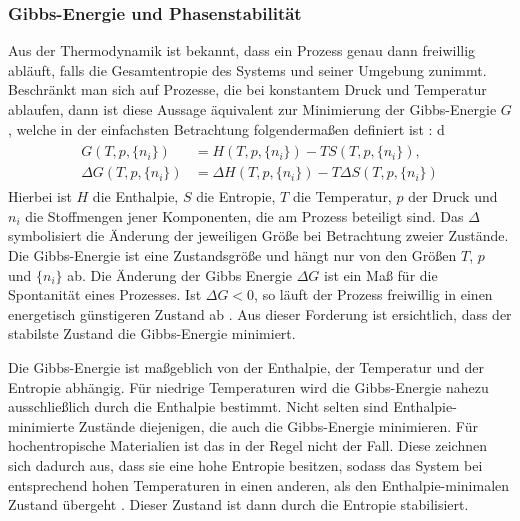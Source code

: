 \subsubsection{Gibbs-Energie und Phasenstabilität}
Aus der Thermodynamik ist bekannt, dass ein Prozess genau dann freiwillig abläuft, falls die Gesamtentropie des
Systems und seiner Umgebung zunimmt.
Beschränkt man sich auf Prozesse, die bei konstantem Druck und Temperatur ablaufen, dann ist diese Aussage äquivalent
zur Minimierung der Gibbs-Energie $G$, welche in der einfachsten Betrachtung folgendermaßen definiert ist
\autocite{Demtrder2015}:
d\begin{align}
    \begin{split}
        G(T,p, \{ n_{i} \})&=H(T,p,\{ n_{i} \})-TS(T,p,\{ n_{i} \}), \\
        \Delta G(T, p, \{ n_{i} \})&=\Delta H(T,p, \{ n_{i} \})-T \Delta S(T,p, \{ n_{i} \})
    \end{split}
    \label{eq:gibbs}
\end{align}
Hierbei ist $H$ die Enthalpie, $S$ die Entropie, $T$ die Temperatur, $p$ der Druck und $n_{i}$ die Stoffmengen jener
Komponenten, die am Prozess beteiligt sind.
Das $\Delta$ symbolisiert die Änderung der jeweiligen Größe bei Betrachtung zweier Zustände.
Die Gibbs-Energie ist eine Zustandsgröße und hängt nur von den Größen $T$, $p$ und $\{ n_{i} \}$ ab.
Die Änderung der Gibbs Energie $\Delta G$ ist ein Maß für die Spontanität eines Prozesses.
Ist $\Delta G < 0$, so läuft der Prozess freiwillig in einen energetisch günstigeren Zustand ab \autocite{rost_phd}.
Aus dieser Forderung ist ersichtlich, dass der stabilste Zustand die Gibbs-Energie minimiert.

Die Gibbs-Energie ist maßgeblich von der Enthalpie, der Temperatur und der Entropie abhängig.
Für niedrige Temperaturen wird die Gibbs-Energie nahezu ausschließlich durch die Enthalpie bestimmt.
Nicht selten sind Enthalpie-minimierte Zustände diejenigen, die auch die Gibbs-Energie minimieren.
Für hochentropische Materialien ist das in der Regel nicht der Fall.
Diese zeichnen sich dadurch aus, dass sie eine hohe Entropie besitzen, sodass das System
bei entsprechend hohen Temperaturen in einen anderen, als den Enthalpie-minimalen Zustand übergeht \autocite{Rost2015}.
Dieser Zustand ist dann durch die Entropie stabilisiert.

